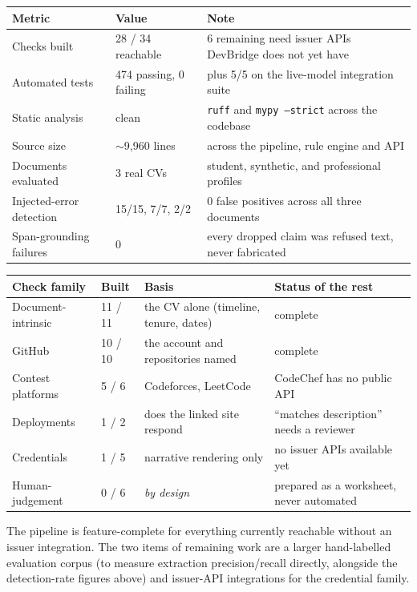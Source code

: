 \documentclass[11pt,a4paper]{article}
\begin{document}
\begin{center}\small
\begin{tabular}{@{}L{3.4cm}L{3.2cm}L{6.0cm}@{}}
\toprule
\textbf{Metric} & \textbf{Value} & \textbf{Note} \\
\midrule
Checks built & 28 / 34 reachable & 6 remaining need issuer APIs DevBridge does not yet have \\
Automated tests & 474 passing, 0 failing & plus 5/5 on the live-model integration suite \\
Static analysis & clean & \texttt{ruff} and \texttt{mypy --strict} across the codebase \\
Source size & $\sim$9{,}960 lines & across the pipeline, rule engine and API \\
Documents evaluated & 3 real CVs & student, synthetic, and professional profiles \\
Injected-error detection & 15/15, 7/7, 2/2 & 0 false positives across all three documents \\
Span-grounding failures & 0 & every dropped claim was refused text, never fabricated \\
\bottomrule
\end{tabular}
\end{center}

\begin{center}\small
\begin{tabular}{@{}L{2.6cm}C{1.3cm}L{4.1cm}L{4.6cm}@{}}
\toprule
\textbf{Check family} & \textbf{Built} & \textbf{Basis} & \textbf{Status of the rest} \\
\midrule
Document-intrinsic & 11 / 11 & the CV alone (timeline, tenure, dates) & complete \\
GitHub & 10 / 10 & the account and repositories named & complete \\
Contest platforms & 5 / 6 & Codeforces, LeetCode & CodeChef has no public API \\
Deployments & 1 / 2 & does the linked site respond & ``matches description'' needs a reviewer \\
Credentials & 1 / 5 & narrative rendering only & no issuer APIs available yet \\
Human-judgement & 0 / 6 & \emph{by design} & prepared as a worksheet, never automated \\
\bottomrule
\end{tabular}
\end{center}

The pipeline is feature-complete for everything currently reachable without
an issuer integration. The two items of remaining work are a larger
hand-labelled evaluation corpus (to measure extraction precision/recall
directly, alongside the detection-rate figures above) and issuer-API
integrations for the credential family.
\end{document}
